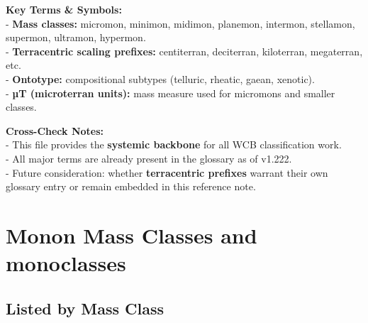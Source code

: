 \documentclass[
  letterpaper,
]{book}
\begin{document}
\textbf{Key Terms \& Symbols:}\\
- \textbf{Mass classes:} micromon, minimon, midimon, planemon, intermon,
stellamon, supermon, ultramon, hypermon.\\
- \textbf{Terracentric scaling prefixes:} centiterran, deciterran,
kiloterran, megaterran, etc.\\
- \textbf{Ontotype:} compositional subtypes (telluric, rheatic, gaean,
xenotic).\\
- \textbf{µT (microterran units):} mass measure used for micromons and
smaller classes.

\textbf{Cross-Check Notes:}\\
- This file provides the \textbf{systemic backbone} for all WCB
classification work.\\
- All major terms are already present in the glossary as of v1.222.\\
- Future consideration: whether \textbf{terracentric prefixes} warrant
their own glossary entry or remain embedded in this reference note.

\chapter{Monon Mass Classes and
monoclasses}\label{monon-mass-classes-and-monoclasses}

\section{Listed by Mass Class}\label{listed-by-mass-class}
\end{document}

